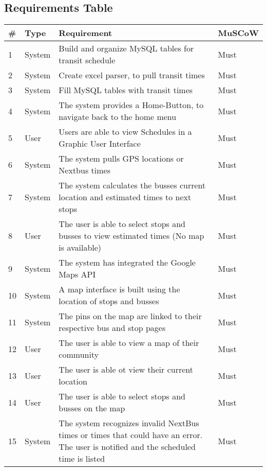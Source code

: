 \documentclass[a4paper,12pt]{article}
\begin{document}
\subsection{Requirements Table}
\begin{tabular}{p{0.4cm}|p{2cm}|p{8cm}|p{1.7cm}}
\# &Type&Requirement&MuSCoW\\
\hline
1 & System & Build and organize MySQL tables for transit schedule & Must \\
\hline
2 & System & Create excel parser, to pull transit times & Must \\
\hline
3 & System & Fill MySQL tables with transit times & Must \\
\hline
4 & System & The system provides a Home-Button, to navigate back to the home menu & Must \\
\hline
5 & User & Users are able to view Schedules in a Graphic User Interface & Must \\
\hline
6 & System & The system pulls GPS locations or Nextbus times & Must \\
\hline
7 & System & The system calculates the busses current location and estimated times to next stops & Must \\
\hline
8 & User & The user is able to select stops and busses to view estimated times (No map is available) & Must \\
\hline
9 & System & The system has integrated the Google Maps API & Must \\
\hline
10 & System & A map interface is built using the location of stops and busses & Must \\
\hline
11 & System & The pins on the map are linked to their respective bus and stop pages & Must \\
\hline
12 & User & The user is able to view a map of their community & Must \\
\hline
13 & User & The user is able ot view their current location & Must \\
\hline
14 & User & The user is able to select stops and busses on the map & Must \\
\hline
15 & System & The system recognizes invalid NextBus times or times that could have an error. The user is notified and the scheduled time is listed & Must \\
\hline

\end{tabular}

\pagebreak
\end{document}
